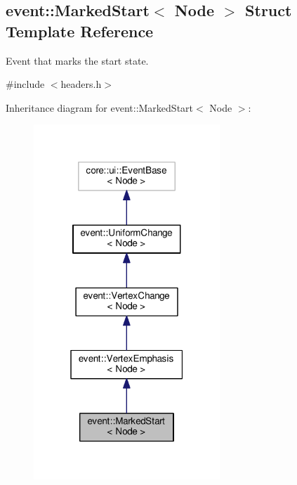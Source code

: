 \hypertarget{structevent_1_1MarkedStart}{}\subsection{event\+:\+:Marked\+Start$<$ Node $>$ Struct Template Reference}
\label{structevent_1_1MarkedStart}


Event that marks the start state.  




{\ttfamily \#include $<$headers.\+h$>$}



Inheritance diagram for event\+:\+:Marked\+Start$<$ Node $>$\+:\nopagebreak
\begin{figure}[H]
\begin{center}
\leavevmode
\includegraphics[width=199pt]{structevent_1_1MarkedStart__inherit__graph}
\end{center}
\end{figure}


